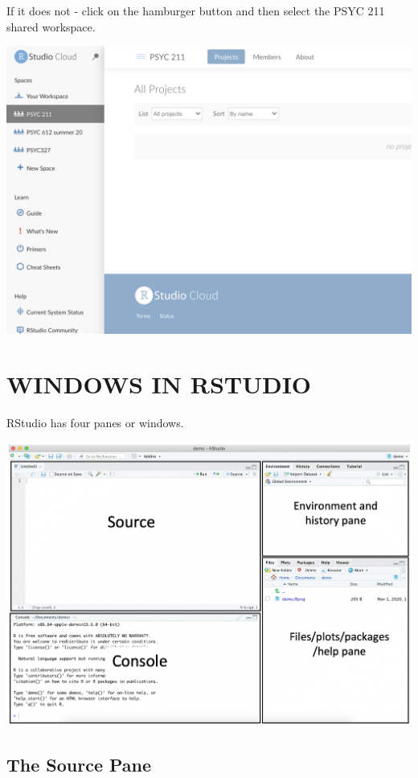 \documentclass[
]{book}
\begin{document}
If it does not - click on the hamburger button and then select the PSYC 211 shared workspace.

\includegraphics{img/newproj2.png}

\hypertarget{windows-in-rstudio}{%
\section{WINDOWS IN RSTUDIO}\label{windows-in-rstudio}}

RStudio has four panes or windows.

\includegraphics{img/rwindow.png}

\hypertarget{the-source-pane}{%
\subsection{The Source Pane}\label{the-source-pane}}
\end{document}
